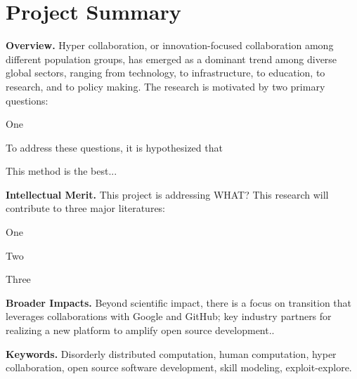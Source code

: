 
\section*{Project Summary} %
\label{sec:projectSummary}

\noindent
\textbf{Overview.}
Hyper collaboration, or innovation-focused collaboration among different population groups, has emerged as a dominant trend among diverse global sectors, ranging from technology, to infrastructure, to education, to research, and to policy making.
The research is motivated by two primary questions:
\begin{enumerate*}[label=(\arabic*),itemsep=5pt]
  \item One
\end{enumerate*} To address these questions, it is hypothesized that
\begin{enumerate*}[label=(\arabic*),itemsep=5pt]
  \item This method is the best...
\end{enumerate*}

\medskip\noindent
\textbf{Intellectual Merit.}
This project is addressing WHAT? This research will contribute to three major literatures:
\begin{enumerate*}[label=(\arabic*),itemsep=5pt]
  \item One
  \item Two
  \item Three
\end{enumerate*}


\medskip\noindent
\textbf{Broader Impacts.}
Beyond scientific impact, there is a focus on transition that leverages collaborations with Google and GitHub; key industry partners for realizing a new platform to amplify open source development..

\medskip\noindent
\textbf{Keywords.} Disorderly distributed computation, human computation, hyper
collaboration, open source software development, skill modeling, exploit-explore.
